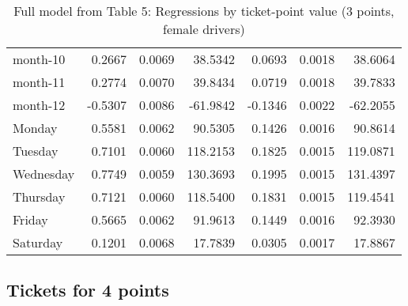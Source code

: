 \documentclass[10pt]{article}
\begin{document}
\begin{table}[ht]
\begin{tabular}{lrrrrrr}
  month-10 & 0.2667 & 0.0069 & 38.5342 & 0.0693 & 0.0018 & 38.6064 \\ 
  month-11 & 0.2774 & 0.0070 & 39.8434 & 0.0719 & 0.0018 & 39.7833 \\ 
  month-12 & -0.5307 & 0.0086 & -61.9842 & -0.1346 & 0.0022 & -62.2055 \\ 
  Monday & 0.5581 & 0.0062 & 90.5305 & 0.1426 & 0.0016 & 90.8614 \\ 
  Tuesday & 0.7101 & 0.0060 & 118.2153 & 0.1825 & 0.0015 & 119.0871 \\ 
  Wednesday & 0.7749 & 0.0059 & 130.3693 & 0.1995 & 0.0015 & 131.4397 \\ 
  Thursday & 0.7121 & 0.0060 & 118.5400 & 0.1831 & 0.0015 & 119.4541 \\ 
  Friday & 0.5665 & 0.0062 & 91.9613 & 0.1449 & 0.0016 & 92.3930 \\ 
  Saturday & 0.1201 & 0.0068 & 17.7839 & 0.0305 & 0.0017 & 17.8867 \\ 
   \hline
\end{tabular}
\caption{Full model from Table 5: Regressions by ticket-point value (3 points, female drivers)} 
\label{tab_5_3_pts_no_age_F}
\end{table}


\clearpage
\pagebreak




\subsection{Tickets for 4 points}



\end{document}
